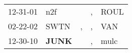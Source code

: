 \begin{supertabular}{p{0.07\textwidth}p{0.06\textwidth}p{0.02\textwidth}p{0.02\textwidth}p{0.06\textwidth}}
 12-31-01\textsuperscript{} &            n2f\textsuperscript{} &    &  , &  ROUL\textsuperscript{} \\
 02-22-02\textsuperscript{} &           SWTN\textsuperscript{} &  , &  , &   VAN\textsuperscript{} \\
 12-30-10\textsuperscript{} &  \textbf{JUNK\textsuperscript{}} &    &  , &  mulc\textsuperscript{} \\
\end{supertabular}
